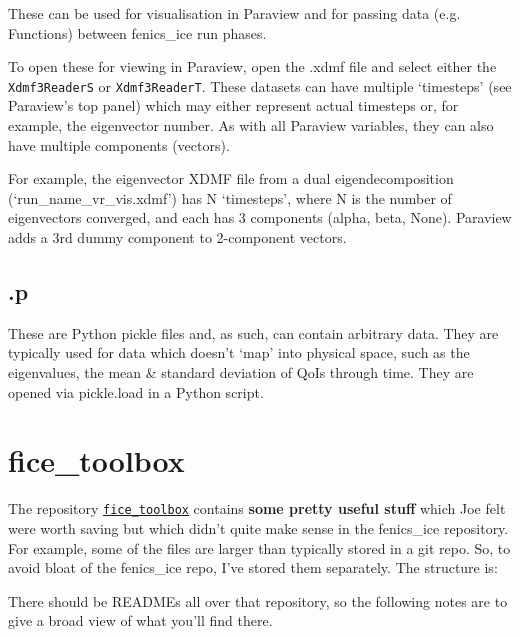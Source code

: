 \documentclass[11pt, reqno, nocenter]{article}
\begin{document}
These can be used for visualisation in Paraview and for passing data (e.g. Functions) between fenics\_ice run phases.

To open these for viewing in Paraview, open the .xdmf file and select either the \texttt{Xdmf3ReaderS} or \texttt{Xdmf3ReaderT}. These datasets can have multiple `timesteps' (see Paraview's top panel) which may either represent actual timesteps or, for example, the eigenvector number. As with all Paraview variables, they can also have multiple components (vectors).

For example, the eigenvector XDMF file from a dual eigendecomposition (`run\_name\_vr\_vis.xdmf') has N `timesteps', where N is the number of eigenvectors converged, and each has 3 components (alpha, beta, None). Paraview adds a 3rd dummy component to 2-component vectors.

\subsection{.p}

These are Python pickle files and, as such, can contain arbitrary data. They are typically used for data which doesn't `map' into physical space, such as the eigenvalues, the mean \& standard deviation of QoIs through time. They are opened via pickle.load in a Python script.

\section{fice\_toolbox} \label{sec:toolbox}

The repository \href{https://github.com/EdiGlacUQ/fice_toolbox}{{\tt fice\_toolbox}} contains \textbf{some pretty useful stuff} which Joe felt were worth saving but which didn't quite make sense in the fenics\_ice repository. For example, some of the files are larger than typically stored in a git repo.
So, to avoid bloat of the fenics\_ice repo, I've stored them separately. The structure is: \\


There should be READMEs all over that repository, so the following notes are to give a broad view of what you'll find there.
\end{document}
